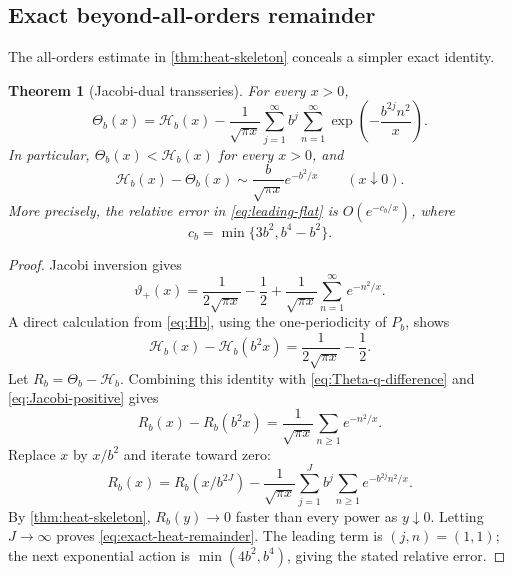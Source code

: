 \documentclass[11pt]{article}
\newtheorem{theorem}{Theorem}[section]
\theoremstyle{definition}
\theoremstyle{remark}
\begin{document}
\subsection{Exact beyond-all-orders remainder}

The all-orders estimate in \cref{thm:heat-skeleton} conceals a simpler exact identity.

\begin{theorem}[Jacobi-dual transseries]\label{thm:exact-heat-remainder}
For every \(x>0\),
\begin{equation}\label{eq:exact-heat-remainder}
\boxed{
 \Theta_b(x)=\mathcal H_b(x)
 -\frac1{\sqrt{\pi x}}
  \sum_{j=1}^{\infty}b^j
  \sum_{n=1}^{\infty}
  \exp\!\left(-\frac{b^{2j}n^2}{x}\right).
}
\end{equation}
In particular, \(\Theta_b(x)<\mathcal H_b(x)\) for every \(x>0\), and
\begin{equation}\label{eq:leading-flat}
 \mathcal H_b(x)-\Theta_b(x)
 \sim\frac{b}{\sqrt{\pi x}}e^{-b^2/x}
 \qquad(x\downarrow0).
\end{equation}
More precisely, the relative error in \eqref{eq:leading-flat} is
\(O(e^{-c_b/x})\), where
\begin{equation}
  c_b=\min\{3b^2,b^4-b^2\}.
\end{equation}
\end{theorem}

\begin{proof}
Jacobi inversion gives
\begin{equation}\label{eq:Jacobi-positive}
 \vartheta_+(x)=
 \frac1{2\sqrt{\pi x}}-\frac12
 +\frac1{\sqrt{\pi x}}
  \sum_{n=1}^{\infty}e^{-n^2/x}.
\end{equation}
A direct calculation from \eqref{eq:Hb}, using the one-periodicity of \(P_b\), shows
\begin{equation}
 \mathcal H_b(x)-\mathcal H_b(b^2x)
 =\frac1{2\sqrt{\pi x}}-\frac12.
\end{equation}
Let \(R_b=\Theta_b-\mathcal H_b\).  Combining this identity with
\eqref{eq:Theta-q-difference} and \eqref{eq:Jacobi-positive} gives
\begin{equation}\label{eq:R-renewal}
 R_b(x)-R_b(b^2x)=
 \frac1{\sqrt{\pi x}}\sum_{n\ge1}e^{-n^2/x}.
\end{equation}
Replace \(x\) by \(x/b^2\) and iterate toward zero:
\[
 R_b(x)=R_b(x/b^{2J})-
 \frac1{\sqrt{\pi x}}
 \sum_{j=1}^{J}b^j\sum_{n\ge1}e^{-b^{2j}n^2/x}.
\]
By \cref{thm:heat-skeleton}, \(R_b(y)\to0\) faster than every power as
\(y\downarrow0\).  Letting \(J\to\infty\) proves \eqref{eq:exact-heat-remainder}.  The leading term is \((j,n)=(1,1)\); the next exponential action is
\(\min(4b^2,b^4)\), giving the stated relative error.
\end{proof}
\end{document}

